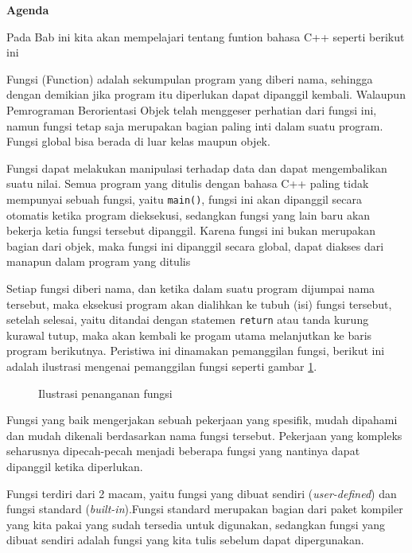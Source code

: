 \textbf{Agenda}

Pada Bab ini kita akan mempelajari tentang funtion bahasa C++ seperti berikut ini

\minitoc

Fungsi (Function) adalah sekumpulan program yang diberi nama, sehingga
dengan demikian jika program itu diperlukan dapat dipanggil kembali.
Walaupun Pemrograman Berorientasi Objek telah menggeser perhatian dari
fungsi ini, namun fungsi tetap saja merupakan bagian paling inti dalam
suatu program. Fungsi global bisa berada di luar kelas maupun objek.

Fungsi dapat melakukan manipulasi terhadap data dan dapat mengembalikan
suatu nilai. Semua program yang ditulis dengan bahasa C++ paling tidak
mempunyai sebuah fungsi, yaitu \texttt{main()}, fungsi ini akan
dipanggil secara otomatis ketika program dieksekusi, sedangkan fungsi
yang lain baru akan bekerja ketia fungsi tersebut dipanggil. Karena
fungsi ini bukan merupakan bagian dari objek, maka fungsi ini dipanggil
secara global, dapat diakses dari manapun dalam program yang ditulis

Setiap fungsi diberi nama, dan ketika dalam suatu program dijumpai nama
tersebut, maka eksekusi program akan dialihkan ke tubuh (isi) fungsi
tersebut, setelah selesai, yaitu ditandai dengan statemen
\texttt{return} atau tanda kurung kurawal tutup, maka akan kembali ke
progam utama melanjutkan ke baris program berikutnya. Peristiwa ini
dinamakan pemanggilan fungsi, berikut ini adalah ilustrasi mengenai
pemanggilan fungsi seperti gambar \ref{gambar4-1}.

\begin{figure}[htbp]
\centering
{}
\label{gambar4-1}
\caption{Ilustrasi penanganan fungsi}
\end{figure}

Fungsi yang baik mengerjakan sebuah pekerjaan yang spesifik, mudah
dipahami dan mudah dikenali berdasarkan nama fungsi tersebut. Pekerjaan
yang kompleks seharusnya dipecah-pecah menjadi beberapa fungsi yang
nantinya dapat dipanggil ketika diperlukan.

Fungsi terdiri dari 2 macam, yaitu fungsi yang dibuat sendiri
(\emph{user-defined}) dan fungsi standard (\emph{built-in}).Fungsi
standard merupakan bagian dari paket kompiler yang kita pakai yang sudah
tersedia untuk digunakan, sedangkan fungsi yang dibuat sendiri adalah
fungsi yang kita tulis sebelum dapat dipergunakan.

